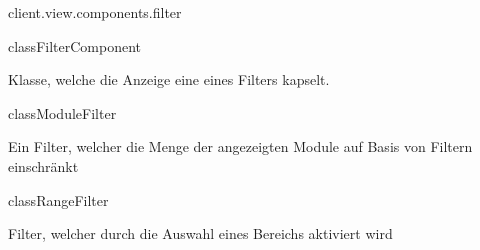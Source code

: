 \begin{texdocpackage}{client.view.components.filter}
\label{texdoclet:edu.kit.informatik.studyplan.client.view.components.filter}

\begin{texdocclass}{class}{FilterComponent}
\label{texdoclet:edu.kit.informatik.studyplan.client.view.components.filter.FilterComponent}
\begin{texdocclassintro}
Klasse, welche die Anzeige eine eines Filters kapselt.\end{texdocclassintro}
\begin{texdocclassconstructors}
\end{texdocclassconstructors}
\begin{texdocclassmethods}
\end{texdocclassmethods}
\end{texdocclass}


\begin{texdocclass}{class}{ModuleFilter}
\label{texdoclet:edu.kit.informatik.studyplan.client.view.components.filter.ModuleFilter}
\begin{texdocclassintro}
Ein Filter, welcher die Menge der angezeigten Module auf Basis von Filtern
 einschränkt\end{texdocclassintro}
\begin{texdocclassconstructors}
\end{texdocclassconstructors}
\begin{texdocclassmethods}
\end{texdocclassmethods}
\end{texdocclass}


\begin{texdocclass}{class}{RangeFilter}
\label{texdoclet:edu.kit.informatik.studyplan.client.view.components.filter.RangeFilter}
\begin{texdocclassintro}
Filter, welcher durch die Auswahl eines Bereichs aktiviert wird\end{texdocclassintro}
\begin{texdocclassconstructors}
\end{texdocclassconstructors}
\begin{texdocclassmethods}
\end{texdocclassmethods}
\end{texdocclass}



\end{texdocpackage}
